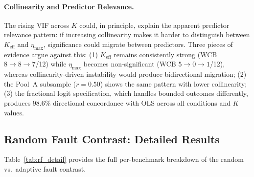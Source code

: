 \paragraph{Collinearity and Predictor Relevance.} The rising VIF across $K$ could, in principle, explain the apparent predictor relevance pattern: if increasing collinearity makes it harder to distinguish between $K_{\mathrm{eff}}$ and $\eta_{\max}$, significance could migrate between predictors. Three pieces of evidence argue against this: (1) $K_{\mathrm{eff}}$ remains consistently strong (WCB $8 \to 8 \to 7$/12) while $\eta_{\max}$ becomes non-significant (WCB $5 \to 0 \to 1$/12), whereas collinearity-driven instability would produce bidirectional migration; (2) the Pool~A subsample ($r{=}0.50$) shows the same pattern with lower collinearity; (3) the fractional logit specification, which handles bounded outcomes differently, produces 98.6\% directional concordance with OLS across all conditions and $K$ values.

\subsection{Random Fault Contrast: Detailed Results}
\label{app:rf_contrast_detail}

Table~\ref{tab:rf_detail} provides the full per-benchmark breakdown of the random vs.\ adaptive fault contrast.

\begin{table}[h]
\centering
\caption{Random vs.\ adaptive fault contrast at $K{=}5$ (3{,}003 panels). Random faults flip judge votes at observed per-judge error rates (2 conditions: MMLU and ARC); adaptive results are averaged across 12 attack conditions. $R^2$ drops from 0.659--0.751 (random) to 0.285--0.340 (adaptive), demonstrating the predictability gap.}
\label{tab:rf_detail}
\small
{}
\end{table}

